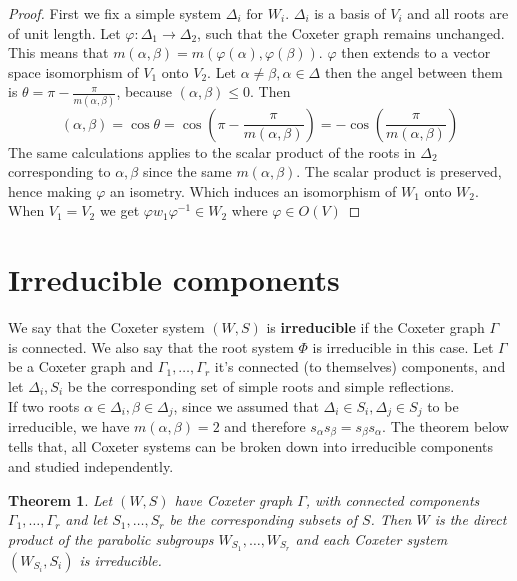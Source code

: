 \documentclass[11pt]{article}
\theoremstyle{plain}
\newtheorem{theorem}{Theorem}[section]
\begin{document}
\begin{proof}
	First we fix a simple system $ \Delta_i \text{ for } W_i $. $ \Delta_i $ is a basis of $ V_i $ and all roots are of
	unit length. Let $ \varphi: \Delta_1 \to \Delta_2 $, such that the Coxeter graph remains unchanged. This means that
	$ m \left( \alpha , \beta  \right)  = m \left( \varphi (\alpha), \varphi (\beta) \right)$. $ \varphi $  
	then extends to a vector space isomorphism of $ V_1 $ onto $ V_2 $. Let $ \alpha  \neq \beta , \alpha \in \Delta $ then
	the angel between them is $ \theta = \pi - \frac{\pi}{m (\alpha,\beta) }  $, because $ \left( \alpha ,\beta \right)
	\leq 0 $. Then
	$$
	\left( \alpha ,\beta \right) = \cos \theta = \cos \left( \pi - \frac{\pi}{m  
	\left( \alpha ,\beta \right)}  \right) = - \cos \left(  \frac{\pi}{m  \left( \alpha ,\beta \right)} \right)
	$$
	The same calculations applies to the scalar product of the roots in $ \Delta_2 $ corresponding to $ \alpha , \beta  $ 
	since the same $ m (\alpha,\beta) $. The scalar product is preserved, hence making $ \varphi $ an isometry. Which 
	induces an isomorphism of $ W_1  $ onto $ W_2 $. 
	\\
	When $ V_1 = V_2 $ we get $ \varphi w_1 \varphi ^{-1} \in W_2 $ where $ \varphi \in O(V) $ 
\end{proof}

\section{Irreducible components}
We say that the Coxeter system $ \left( W, S \right) $ is \textbf{irreducible} if the Coxeter graph $ \Gamma $ is
connected. We also say that the root system $ \Phi $ is irreducible in this case. Let $ \Gamma  $ be a Coxeter 
graph and  $ \Gamma_1, \ldots, \Gamma_r$ it's connected (to themselves) components, and let $ \Delta_i, S_i $ be the corresponding set 
of simple roots and simple reflections.
\vspace{0.6em}\\
If two roots $ \alpha \in \Delta_i, \beta \in \Delta_j $, since we assumed that $ \Delta_i \in S_i, \Delta_j \in S_j $ to be 
irreducible, we have $ m \left( \alpha ,\beta  \right) = 2 $ and therefore $ s_{\alpha } s_{\beta } = s_{\beta } s_{\alpha } $. 
The theorem below tells that, all Coxeter systems can be broken down into irreducible components and studied independently.

\begin{theorem}
	Let $ \left( W, S \right) $ have Coxeter graph $ \Gamma  $, with connected components $ \Gamma_1, \ldots, \Gamma_r $ and let 
	$ S_1, \ldots, S_r $ be the corresponding subsets of $ S $. Then $ W $ is the direct product of the parabolic subgroups 
	$ W_{S_1}, \ldots, W_{S_r} $ and each Coxeter system $ \left( W_{S_i}, S_i \right)  $ is irreducible.
\end{theorem}
\end{document}
